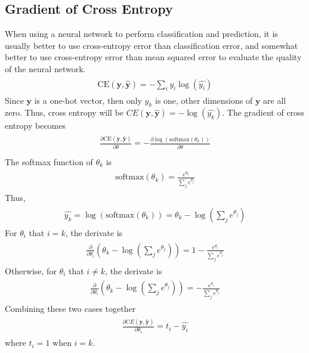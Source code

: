 \documentclass[paper=a4, fontsize=11pt]{scrartcl} %
\numberwithin{equation}{section} %
\numberwithin{figure}{section} %
\numberwithin{table}{section} %
\begin{document}
\subsection{Gradient of Cross Entropy}
When using a neural network to perform classification and prediction, it is usually better to use cross-entropy error than classification error, and somewhat better to use cross-entropy error than mean squared error to evaluate the quality of the neural network.
\begin{align} 
\begin{split}
	\mbox{CE}(\textbf{y}, \hat{\textbf{y}}) = -\sum_{i}y_{i} \log (\hat{y_{i}})
\end{split}					
\end{align}
Since $\textbf{y}$ is a one-hot vector, then only $y_{k}$ is one, other dimensions of $\textbf{y}$ are all zero. Thus, cross entropy will be $CE(\textbf{y},\hat{\textbf{y}})= - \log (\hat{y_{k}})$. The gradient of cross entropy becomes
\begin{align} 
\begin{split}
	\frac{\partial \mbox{CE}(\textbf{y}, \hat{\textbf{y}}) }{\partial \theta} = 
	- \frac{\partial \log (\mbox{softmax}(\theta_{k})) }{\partial \theta}\\	
\end{split}					
\end{align}
The softmax function of $\theta_{k}$ is 
\begin{align} 
\begin{split}
	\mbox{softmax}(\theta_{k}) = \frac{e^{\theta_{k}}}{\sum_{j}e^{\theta_{j}}}
\end{split}			
\end{align}
Thus, 
\begin{align} 
\begin{split}
	\hat{y_{k}} = \log(\mbox{softmax}(\theta_{k})) = \theta_{k} - \log(\sum_{j}e^{\theta_{j}})
\end{split}			
\end{align}
For $\theta_{i}$ that $i=k$, the derivate is 
\begin{align} 
\begin{split}
	\frac{\partial}{\partial \theta_{i}} (\theta_{k} - \log(\sum_{j}e^{\theta_{j}})) =
	1 - \frac{e^{\theta_{i}}}{\sum_{j}e^{\theta_{j}}}
\end{split}			
\end{align}
Otherwise, for $\theta_{i}$ that $i \neq k$, the derivate is
\begin{align} 
\begin{split}
	\frac{\partial}{\partial \theta_{i}} (\theta_{k} - \log(\sum_{j}e^{\theta_{j}})) =
	 - \frac{e^{\theta_{i}}}{\sum_{j}e^{\theta_{j}}}
\end{split}			
\end{align}
Combining these two cases together
\begin{align} 
\begin{split}
	\frac{\partial CE(\textbf{y},\hat{\textbf{y}})}{\partial \theta_{i}} = t_{i} - \hat{y_{i}}
\end{split}			
\end{align}
where $t_{i}=1$ when $i=k$.
\end{document}
